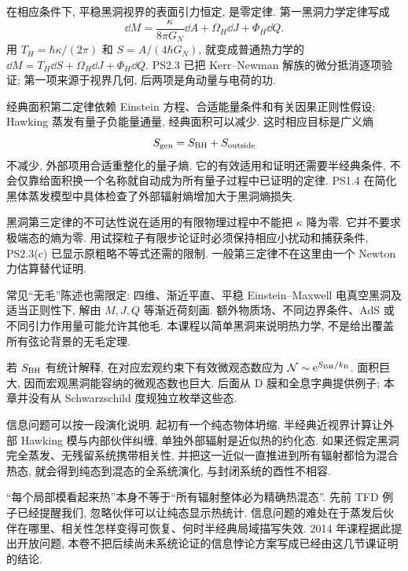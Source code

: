 在相应条件下, 平稳黑洞视界的表面引力恒定, 是零定律. 第一黑洞力学定律写成
\[
\dd M=\frac{\kappa}{8\pi G_N}\dd A
+\Omega_H\dd J+\Phi_H\dd Q.
\]
用 $T_H=\hbar\kappa/(2\pi)$ 和 $S=A/(4\hbar G_N)$, 就变成普通热力学的 $\dd M=T_H\dd S+\Omega_H\dd J+\Phi_H\dd Q$. PS2.3 已把 Kerr--Newman 解族的微分抵消逐项验证; 第一项来源于视界几何, 后两项是角动量与电荷的功.

经典面积第二定律依赖 Einstein 方程、合适能量条件和有关因果正则性假设; Hawking 蒸发有量子负能量通量, 经典面积可以减少. 这时相应目标是广义熵
\[
S_{\rm gen}=S_{\rm BH}+S_{\rm outside}
\]
不减少, 外部项用合适重整化的量子熵. 它的有效适用和证明还需要半经典条件, 不会仅靠给面积换一个名称就自动成为所有量子过程中已证明的定律. PS1.4 在简化黑体蒸发模型中具体检查了外部辐射熵增加大于黑洞熵损失.

黑洞第三定律的不可达性说在适用的有限物理过程中不能把 $\kappa$ 降为零. 它并不要求极端态的熵为零. 用试探粒子有限步论证时必须保持相应小扰动和捕获条件, PS2.3(c) 已显示原粗略不等式还需的限制. 一般第三定律不在这里由一个 Newton 力估算替代证明.

常见“无毛”陈述也需限定: 四维、渐近平直、平稳 Einstein--Maxwell 电真空黑洞及适当正则性下, 解由 $M,J,Q$ 等渐近荷刻画. 额外物质场、不同边界条件、AdS 或不同引力作用量可能允许其他毛. 本课程以简单黑洞来说明热力学, 不是给出覆盖所有弦论背景的无毛定理.

若 $S_{\rm BH}$ 有统计解释, 在对应宏观约束下有效微观态数应为 $\mathcal N\sim\mathrm e^{S_{\rm BH}/k_{\mathrm B}}$. 面积巨大, 因而宏观黑洞能容纳的微观态数也巨大. 后面从 D 膜和全息字典提供例子; 本章并没有从 Schwarzschild 度规独立枚举这些态.

信息问题可以按一段演化说明. 起初有一个纯态物体坍缩. 半经典近视界计算让外部 Hawking 模与内部伙伴纠缠, 单独外部辐射是近似热的约化态. 如果还假定黑洞完全蒸发、无残留系统携带相关性, 并把这一近似一直推进到所有辐射都恰为混合热态, 就会得到纯态到混态的全系统演化, 与封闭系统的酉性不相容.

“每个局部模看起来热”本身不等于“所有辐射整体必为精确热混态”. 先前 TFD 例子已经提醒我们, 忽略伙伴可以让纯态显示热统计. 信息问题的难处在于蒸发后伙伴在哪里、相关性怎样变得可恢复、何时半经典局域描写失效. 2014 年课程据此提出开放问题, 本卷不把后续尚未系统论证的信息悖论方案写成已经由这几节课证明的结论.
